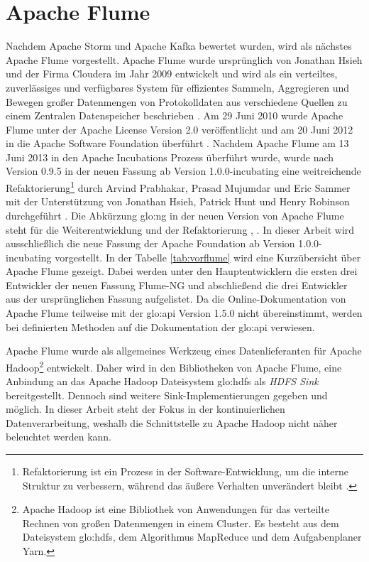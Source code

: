 \section{Apache Flume}

Nachdem Apache Storm und Apache Kafka bewertet wurden, wird als nächstes Apache Flume vorgestellt. Apache Flume wurde ursprünglich von Jonathan Hsieh und der Firma Cloudera im Jahr 2009 entwickelt und wird als ein verteiltes, zuverlässiges und verfügbares System für effizientes Sammeln, Aggregieren und Bewegen großer Datenmengen von Protokolldaten aus verschiedene Quellen zu einem Zentralen Datenspeicher beschrieben . Am 29 Juni 2010 wurde Apache Flume unter der Apache License Version 2.0 veröffentlicht und am 20 Juni 2012 in die Apache Software Foundation überführt . Nachdem Apache Flume am 13 Juni 2013 in den Apache Incubations Prozess überführt wurde, wurde nach Version 0.9.5 in der neuen Fassung ab Version 1.0.0-incubating eine weitreichende Refaktorierung\footnote{Refaktorierung ist ein Prozess in der Software-Entwicklung, um die interne Struktur zu verbessern, während das äußere Verhalten unverändert bleibt .} durch Arvind Prabhakar, Prasad Mujumdar und Eric Sammer mit der Unterstützung von Jonathan Hsieh, Patrick Hunt und Henry Robinson durchgeführt . Die Abkürzung \gls{glo:ng} in der neuen Version von Apache Flume steht für die Weiterentwicklung und der Refaktorierung , . In dieser Arbeit wird ausschließlich die neue Fassung der Apache Foundation ab Version 1.0.0-incubating vorgestellt. In der Tabelle \ref{tab:vorflume} wird eine Kurzübersicht über Apache Flume gezeigt. Dabei werden unter den Hauptentwicklern die ersten drei Entwickler der neuen Fassung Flume-NG und abschließend die drei Entwickler aus der ursprünglichen Fassung aufgelistet. Da die Online-Dokumentation von Apache Flume teilweise mit der \gls{glo:api} Version 1.5.0 nicht übereinstimmt, werden bei definierten Methoden auf die Dokumentation der \gls{glo:api} verwiesen.

Apache Flume wurde als allgemeines Werkzeug eines Datenlieferanten für Apache Hadoop\footnote{Apache Hadoop ist eine Bibliothek von Anwendungen für das verteilte Rechnen von großen Datenmengen in einem Cluster. Es besteht aus dem Dateisystem \gls{glo:hdfs}, dem Algorithmus MapReduce und dem Aufgabenplaner Yarn. } entwickelt. Daher wird in den Bibliotheken von Apache Flume, eine Anbindung an das Apache Hadoop Dateisystem \gls{glo:hdfs} als \textit{HDFS Sink} bereitgestellt. Dennoch sind weitere Sink-Implementierungen gegeben und möglich. In dieser Arbeit steht der Fokus in der kontinuierlichen Datenverarbeitung, weshalb die Schnittstelle zu Apache Hadoop nicht näher beleuchtet werden kann. 

